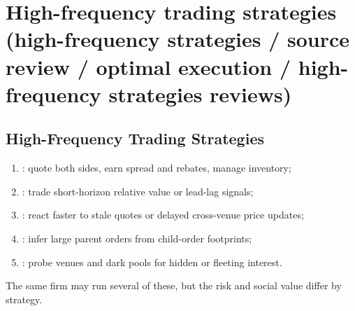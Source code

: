 \documentclass[a4paper,oneside,openany]{book}
\begin{document}
\section*{High-frequency trading strategies (high-frequency strategies / source review / optimal execution / high-frequency strategies reviews)}

\subsection*{High-Frequency Trading Strategies}

\begin{taxonomy} 
\begin{enumerate}[label=\roman*.]
\setlength{\itemsep}{0pt}
\item {}: quote both sides, earn spread and rebates, manage inventory;
\item {}: trade short-horizon relative value or lead-lag signals;
\item {}: react faster to stale quotes or delayed cross-venue price updates;
\item {}: infer large parent orders from child-order footprints;
\item {}: probe venues and dark pools for hidden or fleeting interest.
\end{enumerate}
The same firm may run several of these, but the risk and social value differ by strategy.
\end{taxonomy}
\end{document}
